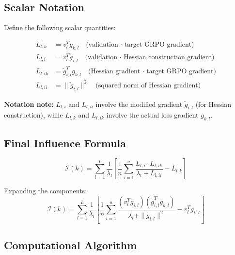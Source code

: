 \documentclass{article}
\begin{document}
\subsection{Scalar Notation}

Define the following scalar quantities:

\begin{align}
L_{l,k} &= v_l^T g_{k,l} \quad \text{(validation · target GRPO gradient)} \\
L_{l,i} &= v_l^T \tilde{g}_{i,l} \quad \text{(validation · Hessian construction gradient)} \\
L_{l,ik} &= \tilde{g}_{i,l}^T g_{k,l} \quad \text{(Hessian gradient · target GRPO gradient)} \\
L_{l,ii} &= \|\tilde{g}_{i,l}\|^2 \quad \text{(squared norm of Hessian gradient)}
\end{align}

\textbf{Notation note:} $L_{l,i}$ and $L_{l,ii}$ involve the modified gradient $\tilde{g}_{i,l}$ (for Hessian construction), while $L_{l,k}$ and $L_{l,ik}$ involve the actual loss gradient $g_{k,l}$.

\subsection{Final Influence Formula}

\begin{equation}\label{eq:final_influence}
\boxed{
\mathcal{I}(k) = \sum_{l=1}^L \frac{1}{\lambda_l}\left[\frac{1}{n}\sum_{i=1}^n \frac{L_{l,i} \cdot L_{l,ik}}{\lambda_l + L_{l,ii}} - L_{l,k}\right]
}
\end{equation}

Expanding the components:
\begin{equation}
\mathcal{I}(k) = \sum_{l=1}^L \frac{1}{\lambda_l}\left[\frac{1}{n}\sum_{i=1}^n \frac{(v_l^T \tilde{g}_{i,l})(\tilde{g}_{i,l}^T g_{k,l})}{\lambda_l + \|\tilde{g}_{i,l}\|^2} - v_l^T g_{k,l}\right]
\end{equation}

\subsection{Computational Algorithm}
\end{document}
